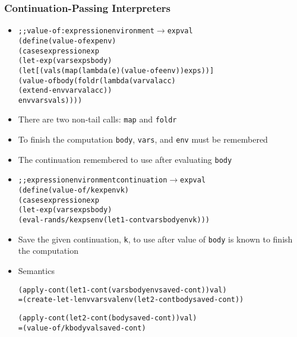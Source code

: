 \documentclass{beamer}
\newcommand{\arrow}{\(\rightarrow\)}
\begin{document}
\begin{frame}[fragile]
\frametitle{Continuation-Passing Interpreters}
\begin{scriptsize}
\begin{itemize}
\item<1->
\begin{alltt}
;; value-of : expression environment \arrow{} expval
(define (value-of exp env)
 (cases expression exp
  (let-exp (vars exps body)
   (let [(vals (map (lambda (e) (value-of e env)) exps))]
    (value-of body (foldr (lambda (var val acc)
                            (extend-env var val acc))
                           env vars vals))))
\end{alltt}

\item<1-> There are two non-tail calls: \texttt{map} and \texttt{foldr}

\item<1-> To finish the computation \texttt{body}, \texttt{vars}, and \texttt{env} must be remembered

\item<1-> The continuation remembered to use after evaluating \texttt{body}

\item<2->
\begin{alltt}
;; expression environment continuation \arrow{} expval
(define (value-of/k exp env k)
  (cases expression exp
    (let-exp (vars exps body)
             (eval-rands/k exps env (let1-cont vars body env k)))
\end{alltt}

\item<2-> Save the given continuation, \texttt{k}, to use after value of \texttt{body} is known to finish the computation

\item<3-> Semantics
\begin{alltt}
  (apply-cont (let1-cont (vars body env saved-cont)) val)
= (create-let-lenv vars val env (let2-cont body saved-cont))

  (apply-cont (let2-cont (body saved-cont)) val)
= (value-of/k body val saved-cont)
\end{alltt}

\end{itemize}
\end{scriptsize}
\end{frame}
\end{document}
